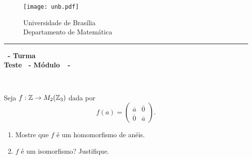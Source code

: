 \documentclass[12pt]{exam}
\begin{document}
    \begin{figure}[h]
        \begin{minipage}[c]{1.7cm}
            \texttt{[image: unb.pdf]}
        \end{minipage}
        \hspace{0pt}
        \begin{minipage}[c]{4in}
            {Universidade de Brasília} \\
            {Departamento de Matemática}
        \end{minipage}
    \end{figure}
    \hrule
    \begin{center}
        {\Large\bf \disciplina\ - Turma \turma}  \\
         {\large\bf Teste \numeroteste\ - Módulo\ \modulo\ -\ \dataavaliacao}
    \end{center}

    \\
    \vspace*{.01cm}


    \vspace{.4cm}


    \questao Seja $f : \mathbb{Z} \to M_2(\mathbb{Z}_3)$ dada por
    \[
        f(a) = \begin{pmatrix}
            \overline{a} & \overline{0}\\
            \overline{0} & \overline{a}
        \end{pmatrix}.
    \]
    \begin{enumerate}[label=({\alph*})]
        \item Mostre que $f$ é um homomorfismo de anéis.

        \item $f$ é um isomorfismo? Justifique.
    \end{enumerate}
\end{document}
